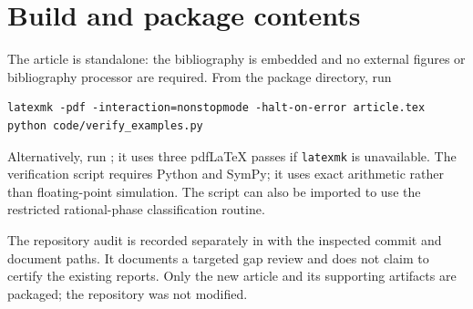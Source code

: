 \documentclass[11pt,a4paper]{article}
\theoremstyle{definition}
\numberwithin{equation}{section}
\begin{document}
\section{Build and package contents}\label{app:build}
The article is standalone: the bibliography is embedded and no external
figures or bibliography processor are required. From the package directory,
run
\begin{lstlisting}
latexmk -pdf -interaction=nonstopmode -halt-on-error article.tex
python code/verify_examples.py
\end{lstlisting}
Alternatively, run ; it uses three pdfLaTeX passes if
\texttt{latexmk} is unavailable. The verification script requires Python
and SymPy; it uses exact arithmetic rather than floating-point simulation.
The script can also be imported to use the restricted rational-phase
classification routine.

The repository audit is recorded separately in 
with the inspected commit and document paths. It documents a targeted gap
review and does not claim to certify the existing reports. Only the new
article and its supporting artifacts are packaged; the repository was not
modified.
\end{document}
